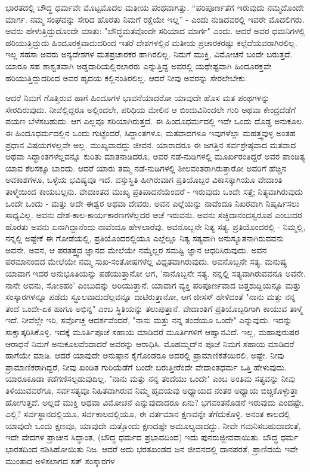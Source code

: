 ಭಾರತದಲ್ಲಿ ಬೌದ್ಧ ಧರ್ಮವೇ ಮೊಟ್ಟಮೊದಲ ಮತೀಯ ಪಂಥವಾಗಿತ್ತು. “ಪರಿಪೂರ್ಣತೆಗೆ ಇರುವುದು ನಮ್ಮದೊಂದೇ ಮಾರ್ಗ. ನಮ್ಮ ಸಂಘವನ್ನು ಸೇರಿದ ಹೊರತು ನಿಮಗೆ ರಕ್ಷೆಯೇ ಇಲ್ಲ” - ಎಂದು ನುಡಿದವರಲ್ಲಿ ಇವರೇ ಮೊದಲಿಗರು. ಅವರು ಹೇಳುತ್ತಿದ್ದುದೊಂದೇ ಮಾತು: "ಬೌದ್ಧಮತವೊಂದೇ ಸರಿಯಾದ ಮಾರ್ಗ" ಎಂದು. ಆದರೆ ಅವರ ಧಮನಿಗಳಲ್ಲಿ ಹರಿಯುತ್ತಿದ್ದುದು ಹಿಂದೂರಕ್ತವಾದುದರಿಂದ ಇತರೆ ದೇಶಗಳಲ್ಲಿನ ಮತೀಯ ಪ್ರಚಾರಕರಷ್ಟು ಕಲ್ಲೆದೆಯವರಾಗಿರಲಿಲ್ಲ. ಇಲ್ಲ ಸಹಸಾ ಅವರು ಅನ್ಯದೇಶಗಳ ಮತಪ್ರಚಾರಕರ ಹಾಗಿರಲಿಲ್ಲ. ನಿಮಗೆ ಮುಕ್ತಿ, ವಿಮೋಚನೆ ಬಂದೇ ಬರುತ್ತದೆ. ಯಾರೂ ಸಹ ಶಾಶ್ವತವಾಗಿ ಅಡ್ಡದಾರಿಯಲ್ಲಿರಲಾರರು ಎನ್ನುತ್ತಿದ್ದ ಅವರಲ್ಲಿ ಯಥೇಷ್ಟವಾಗಿ ಹಿಂದೂರಕ್ತವೇ ಹರಿಯುತ್ತಿದ್ದುದರಿಂದ ಅವರ ಹೃದಯ ಕಲ್ಲಿನಂತಿರಲಿಲ್ಲ. ಆದರೆ ನೀವು ಅವರನ್ನು ಸೇರಲೇಬೇಕು.

ಆದರೆ ನಿಮಗೆ ಗೊತ್ತಿರುವ ಹಾಗೆ ಹಿಂದೂಗಳ ಭಾವನೆಯಾದರೋ ಯಾವುದೇ ಹೊಸ ಮತ ಪಂಥಗಳನ್ನು ಸೇರದಿರುವುದು. ನೀವೆಲ್ಲಿದ್ದರೂ ಅಲ್ಲಿಂದಲೇ, ಪರಿಧಿಯ ಮೇಲಿನ ಆ ಬಿಂದುವಿನಿಂದಲೇ ಗುರಿ ಅಥವಾ ಕೇಂದ್ರದೆಡೆಗೆ ಪಯಣ ಬೆಳೆಸಬಹುದು. ಆಗ ಎಲ್ಲವೂ ಸರಿಯಾಗಿರುತ್ತದೆ. ಈ ಹಿಂದೂಧರ್ಮದಲ್ಲಿ ಇದೇ ಒಂದು ದೊಡ್ಡ ಅನುಕೂಲ. ಈ ಹಿಂದೂಧರ್ಮದಲ್ಲಿನ ಒಂದು ಗುಟ್ಟೆಂದರೆ, ಸಿದ್ಧಾಂತಗಳೂ, ಮತವಾದಗಳೂ ಇವುಗಳೆಲ್ಲಾ ಮಹತ್ತ್ವವುಳ್ಳ ಅಂತಹ ಪ್ರಧಾನ ವಿಷಯಗಳಲ್ಲವೇ ಅಲ್ಲ. ಮುಖ್ಯವಾದದ್ದು ಜೀವನ. ಯಾರಾದರೂ ಈ ಜಗತ್ತಿನ ಸರ್ವಶ್ರೇಷ್ಠವಾದ ಮತವಾದ ಅಥವಾ ಸಿದ್ಧಾಂತಗಳೆಲ್ಲವನ್ನೂ ಕುರಿತು ಮಾತನಾಡಿದರೂ, ಅವರ ನಡೆ-ನುಡಿಗಳಲ್ಲಿ ಮೂರ್ಖರಂತಿದ್ದರೆ ಅವರ ಪಾಂಡಿತ್ಯ ಯಾವ ಕೆಲಸಕ್ಕೂ ಬಾರದು. ಆದರೆ ಯಾರು ತಮ್ಮ ನಡೆ-ನುಡಿಗಳಲ್ಲಿ ಶೀಲವಂತರಾಗಿರುತ್ತಾರೋ ಅವರಿಗೆ ಹೆಚ್ಚಿನ ಅವಕಾಶಗಳೂ, ಒಳ್ಳೆಯ ಭವಿಷ್ಯವೂ ಇದೆ. ವಸ್ತುಸ್ಥಿತಿ ಹೀಗಿರುವಾಗ ಪ್ರತಿಯೊಬ್ಬರ ವಿಕಾಸಕ್ಕಾಗಿಯೂ ವೇದಾಂತಿ ತಾಳ್ಮೆಯಿಂದ ಕಾಯಬಲ್ಲನು. ವೇದಾಂತದ ಮುಖ್ಯ ಪ್ರತಿಪಾದನೆಯೆಂದರೆ - ಇರುವುದು ಒಂದೇ ಸತ್ತೆ; ನಿತ್ಯವಾಗಿರುವುದು ಒಂದೇ ಒಂದು - ಮತ್ತು ಅದೇ ಈಶ್ವರ ಅಥವಾ ದೇವರು. ಅವನ ಎಲ್ಲೆಯನ್ನು ನಾವೆಂದೂ ನಿಖರವಾಗಿ ನಿಷ್ಕರ್ಷಿಸಲು ಸಾಧ್ಯವಿಲ್ಲ. ಅವನು ದೇಶ-ಕಾಲ-ಕಾರ್ಯಕಾರಣಗಳೆಲ್ಲದರ ಆಚೆ ಇರುವನು. ಅವನು ಸಚ್ಚಿದಾನಂದಸ್ವರೂಪ ಎಂಬುದರ ಹೊರತು ಅವನು ಏನಾಗಿದ್ದಾನೆಂದು ನಾವೆಂದೂ ಹೇಳಲಾರೆವು. ಅವನೊಬ್ಬನೇ ನಿತ್ಯ ಸತ್ಯ. ಪ್ರತಿಯೊಂದರಲ್ಲಿ - ನಿಮ್ಮಲ್ಲಿ, ನನ್ನಲ್ಲಿ ಅಷ್ಟೇಕೆ ಈ ಗೋಡೆಯಲ್ಲಿ, ಪ್ರತಿಯೊಂದರಲ್ಲಿಯೂ ಎಲ್ಲೆಲ್ಲೂ ನಿತ್ಯ ಸತ್ಯವಾಗಿ ಅನುಸ್ಯೂತನಾಗಿರುವವನು ಅವನೇ. ಅವನ, ಆ ಪರತತ್ತ್ವದ ಜ್ಞಾನದ ಮೇಲೆಯೇ ನಮ್ಮೆಲ್ಲರ ಸಮಷ್ಟಿ ಜ್ಞಾನ ಆಧರಿಸಿರುವುದು. ಅವನ ಪರಮಾನಂದದ ಮೇಲೆಯೇ ನಮ್ಮ ಸುಖ-ಸಂತೋಷಗಳೆಲ್ಲ ವಿಧೃತವಾಗಿರುವುದು. ಅವನೊಬ್ಬನೇ ಸತ್ಯ. ಮನುಷ್ಯ ಯಾವಾಗ ಇದರ ಅನುಭೂತಿಯನ್ನು ಪಡೆಯುತ್ತಾನೋ ಆಗ, 'ನಾನೊಬ್ಬನೇ ಸತ್ಯ. ನನ್ನಲ್ಲಿ ಸತ್ಯವಾಗಿರುವವನೂ ಅವನೇ. ನಾನೇ ಅವನು, ಸೋಽಹಂ' ಎಂಬುದನ್ನು ಅರಿಯುತ್ತಾನೆ. ಯಾವಾಗ ವ್ಯಕ್ತಿ ಪರಿಪೂರ್ಣವಾದ ಚಿತ್ತಶುದ್ದಿಯನ್ನೂ ಮತ್ತು ಸಂಸ್ಕಾರಗಳನ್ನೂ ಪಡೆದು ಸ್ಥೂಲವಾದುದೆಲ್ಲವನ್ನೂ ದಾಟಿರುತ್ತಾನೋ, ಆಗ ಜೀಸಸ್ ಹೇಳಿದಂತೆ "ನಾನು ಮತ್ತು ನನ್ನ ತಂದೆ ಒಂದೇ-ಏಕ ಹಾಗೂ ಅಭಿನ್ನ" ಎಂಬ ಸ್ಥಿತಿಯನ್ನು ತಲುಪುತ್ತಾನೆ. ವೇದಾಂತಿಗೆ ಪ್ರತಿಯೊಬ್ಬರಿಗಾಗಿ ಕಾಯುವ ತಾಳ್ಮೆ ಇದೆ. ನೀವೆಲ್ಲೇ ಇರಿ, ಸರ್ವೊಚ್ಚ ಆದರ್ಶವೆಂದರೆ, "ನಾನು ಮತ್ತು ನನ್ನ ತಂದೆಯೂ ಒಂದೇ" ಎನ್ನುವುದು. ಇದನ್ನು ಸಾಕ್ಷಾತ್ಕರಿಸಿಕೊಳ್ಳಿ. ಇದಕ್ಕೆ ಮೂರ್ತಿಪೂಜೆ ಸಹಾಯ ಮಾಡಿದರೆ ಮೂರ್ತಿಗಳಿಗೆ ಆಹ್ವಾನವಿದೆ. ಇಲ್ಲ, ಮಹಾಪುರುಷರ ಆರಾಧನೆ ನಿಮಗೆ ಅನುಕೂಲವೆಂದಾದರೆ ಅವರನ್ನು ಆರಾಧಿಸಿ. ಮೊಹಮ್ಮದ್‌ನ ಪೂಜೆ ನಿಮಗೆ ಸಹಾಯ ಮಾಡಿದರೆ ಹಾಗೆಯೇ ಮಾಡಿ. ಆದರೆ ಯಾವುದೇ ಅನುಷ್ಠಾನ ಕೈಗೊಂಡರೂ ಅದರಲ್ಲಿ ಪ್ರಾಮಾಣಿಕತೆಯಿರಲಿ, ಅಷ್ಟೇ. ನೀವು ಪ್ರಾಮಾಣಿಕರಾಗಿದ್ದರೆ, ನೀವು ಖಂಡಿತ ಗುರಿಯೆಡೆಗೆ ಬಂದೇ ಬರುತ್ತೀರೆಂದೇ ವೇದಾಂತಧರ್ಮ ಒತ್ತಿ ಹೇಳುವುದು. ಯಾರೂಕೂಡಾ ಕಡೆಗಣಿಸಲ್ಪಡುವುದಿಲ್ಲ. "ನಾನು ಮತ್ತು ನನ್ನ ತಂದೆಯು ಒಂದೇ" ಎಂಬ ಅಂತಿಮ ಸತ್ಯವನ್ನು ನೀವು ತಿಳಿಯುವವರೆಗೂ, ಸರ್ವಸತ್ಯವೂ ನಿಹಿತವಾಗಿರುವ ನಿಮ್ಮ ಹೃದಯವು ಅಧ್ಯಾಯದ ನಂತರ ಅಧ್ಯಾಯ ಬಿಚ್ಚಿಕೊಳ್ಳುತ್ತಾ ಹೋಗುತ್ತದೆ. ಅಲ್ಲದೆ ಮುಕ್ತಿ ಅಥವಾ ವಿಮೋಚನೆ ಎನ್ನುವುದಾದರೂ ಏನು? ಭಗವಂತನೊಡನೆ ಇರುವುದು ಎಂದಷ್ಟೇ. ಎಲ್ಲಿ? ಸರ್ವಸ್ಥಾನದಲ್ಲಿಯೂ, ಸರ್ವಕಾಲದಲ್ಲಿಯೂ, ಈ ವರ್ತಮಾನ ಕ್ಷಣವನ್ನೇ ತೆಗೆದುಕೊಳ್ಳಿ. ಅನಂತ ಕಾಲದಲ್ಲಿ ಯಾವುದೇ ಒಂದು ಕ್ಷಣವೂ, ಯಾವುದೇ ಮತ್ತೊಂದು ಕ್ಷಣದಷ್ಟೇ ಅಮೂಲ್ಯವಾದದ್ದು. ನೀವೇ ಗಮನಿಸಬಹುದಾದಂತೆ, ಇದೇ ವೇದಗಳ ಪ್ರಾಚೀನ ಸಿದ್ಧಾಂತ, (ಬೌದ್ಧ ಧರ್ಮದ ಪ್ರಭಾವದಿಂದ) ಇದು ಪುನರುಜ್ಜೀವವಾಯಿತು. ಬೌದ್ಧ ಧರ್ಮ ಭಾರತದಿಂದ ನಶಿಸಿಹೋಯಿತು ನಿಜ. ಆದರೆ ಅದು ಭರತಖಂಡದ ಜನ ಜೀವನದಲ್ಲಿ ದಾನಪರತೆ, ಪ್ರಾಣಿದಯೆ ಇವೇ ಮುಂತಾದ ಅಳಿಸಲಾಗದ ಸತ್ ಸಂಸ್ಕಾರಗಳ 